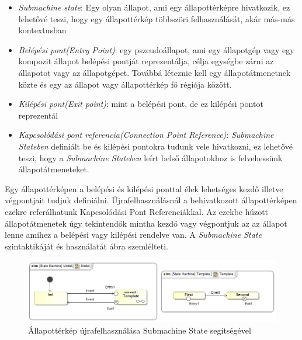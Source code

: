 \begin{itemize}
	\item \emph{Submachine state}: Egy olyan állapot, ami egy állapottérképre hivatkozik, ez lehetővé teszi, hogy egy állapottérkép többszöri felhasználását, akár más-más kontextusban
	\item \emph{Belépési pont(Entry Point)}: egy pszeudoállapot, ami egy állapotgép vagy egy kompozit állapot belépési pontját reprezentálja, célja egységbe zárni az állapotot vagy az állapotgépet. Továbbá léteznie kell egy állapotátmenetnek közte és egy az állapot vagy állapottérkép fő régiója között.
	\item \emph{Kilépési pont(Exit point)}: mint a belépési pont, de ez kilépési pontot reprezentál
	\item \emph{Kapcsolódási pont referencia(Connection Point Reference)}: \emph{Submachine Stateben} definiált be és kilépési pontokra tudunk vele hivatkozni, ez lehetővé teszi, hogy a \emph{Submachine Stateben} leírt belső állapotokhoz is felvehessünk állapotátmeneteket.
	
\end{itemize}
Egy állapottérképen a belépési és kilépési ponttal élek lehetséges kezdő illetve végpontjait tudjuk definiálni. Újrafelhasználásnál a behivatkozott állapottérképen ezekre referálhatunk Kapcsolódási Pont Referenciákkal. Az ezekbe húzott állapotátmenetek úgy tekintendők mintha kezdő vagy végpontjuk az az állapot lenne amihez a belépési vagy kilépési rendelve van. A \emph{Submachine State} szintaktikáját és használatát   ábra szemlélteti.
\begin{figure}[!ht]
	\centering
	\includegraphics[keepaspectratio, width=150mm]{figures/statechart_elements/SubmachineState.png}
	\caption{Állapottérkép újrafelhasználása Submachine State segítségével}
	\label{fig:SubmachineState}
\end{figure}
